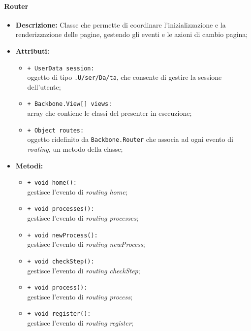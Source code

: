 \paragraph{Router}
\begin{flushleft}
\begin{itemize}
\item \textbf{Descrizione:} Classe che permette di coordinare l'inizializzazione e la renderizzazione delle pagine, gestendo gli eventi e le azioni di cambio pagina;
\item \textbf{Attributi:}
\begin{sloppypar}
\begin{itemize}
\item \texttt{+ UserData session:}\\ oggetto di tipo \texttt{\model{}.U\fshyp{}ser\fshyp{}Da\fshyp{}ta}, che consente di gestire la sessione dell'utente;
\item \texttt{+ Backbone.View[] views:}\\ array che contiene le classi del presenter in esecuzione;
\item \texttt{+ Object routes:}\\ oggetto ridefinito da \texttt{Backbone.Router} che associa ad ogni evento di \textit{routing}, un metodo della classe;
\end{itemize}
\end{sloppypar}
\item \textbf{Metodi:}
\begin{sloppypar}
\begin{itemize}
\item \texttt{+ void home():}\\ gestisce l'evento di \textit{routing home};
\item \texttt{+ void processes():}\\ gestisce l'evento di \textit{routing processes};
\item \texttt{+ void newProcess():}\\ gestisce l'evento di \textit{routing newProcess};
\item \texttt{+ void checkStep():}\\ gestisce l'evento di \textit{routing checkStep};
\item \texttt{+ void process():}\\ gestisce l'evento di \textit{routing process};
\item \texttt{+ void register():}\\ gestisce l'evento di \textit{routing register};

\end{itemize}
\end{sloppypar}
\end{itemize}
\end{flushleft}
